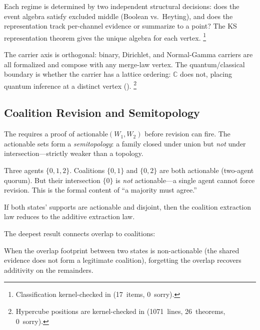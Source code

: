 \documentclass[11pt,openany]{report}
\begin{document}
\noindent
Each regime is determined by two independent structural
decisions: does the event algebra satisfy excluded middle
(Boolean vs.\ Heyting), and does the representation track
per-channel evidence or summarize to a point?  The KS
representation theorem gives the unique algebra for each
vertex.%
\footnote{Classification kernel-checked in
(17~items, 0~sorry).}

The carrier axis is orthogonal: binary, Dirichlet, and
Normal-Gamma carriers are all formalized and compose with any
merge-law vertex.  The quantum/classical boundary is whether the
carrier has a lattice ordering: $\mathbb{C}$ does not, placing
quantum inference at a distinct vertex
().%
\footnote{Hypercube positions are kernel-checked in
(1071~lines, 26~theorems, 0~sorry).}


\subsection{Coalition Revision and Semitopology}

The  requires a proof of
$\mathrm{actionable}(W_1, W_2)$ before revision can fire.
The actionable sets form a \emph{semitopology}: a family closed
under union but \emph{not} under intersection---strictly weaker
than a topology.

\begin{example}
Three agents $\{0, 1, 2\}$.  Coalitions $\{0,1\}$ and $\{0,2\}$
are both actionable (two-agent quorum).  But their intersection
$\{0\}$ is \emph{not} actionable---a single agent cannot force
revision.  This is the formal content of ``a majority must agree.''
\end{example}

\begin{theorem}
\label{thm:additive-of-semitopo}
If both states' supports are actionable and disjoint, then the
coalition extraction law reduces to the additive extraction law.
\end{theorem}

\noindent
The deepest result connects overlap to coalitions:

\begin{theorem}
\label{thm:additive-recovery}
When the overlap footprint between two states is non-actionable
(the shared evidence does not form a legitimate coalition),
forgetting the overlap recovers additivity on the remainders.
\end{theorem}
\end{document}
